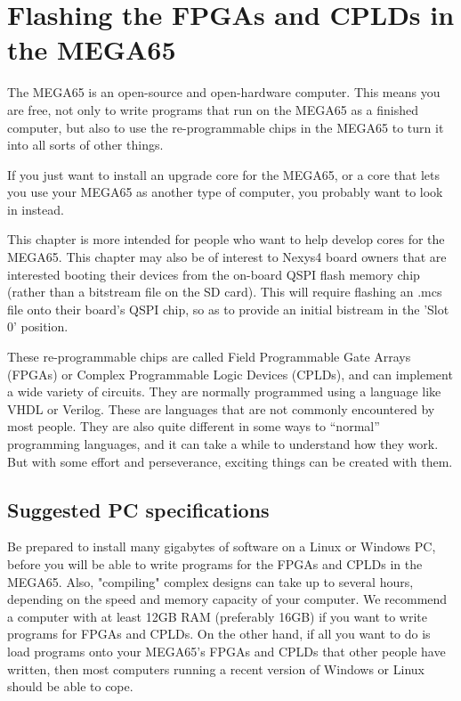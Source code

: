 \chapter{Flashing the FPGAs and CPLDs in the MEGA65}
\label{cha:fpgacpldflashing}

The MEGA65 is an open-source and open-hardware computer. This means you are free,
not only to write programs that run on the MEGA65 as a finished computer, but also to
use the re-programmable chips in the MEGA65 to turn it into all sorts of other things.

If you just want to install an upgrade core for the MEGA65, or a core that lets you use
your MEGA65 as another type of computer, you probably want to look in
 instead.

This chapter is more intended for people who want to help develop cores for the MEGA65. This chapter may also be of interest to Nexys4 board owners that are interested booting their devices from the on-board QSPI flash memory chip (rather than a bitstream file on the SD card). This will require flashing an .mcs file onto their board's QSPI chip, so as to provide an initial bistream in the 'Slot 0' position.

These re-programmable chips are called Field Programmable Gate Arrays (FPGAs) or
Complex Programmable Logic Devices (CPLDs), and can implement a wide variety of circuits.
They are normally programmed using a language like VHDL or Verilog.  These
are languages that are not commonly encountered by most people.  They are also quite
different in some ways to ``normal'' programming languages, and it can take a while to
understand how they work. But with some effort and perseverance, exciting things can be created with them.

\section{Suggested PC specifications}

Be prepared to install many gigabytes of software on a Linux or Windows PC, before you will
be able to write programs for the FPGAs and CPLDs in the MEGA65.  Also,
"compiling" complex
designs can take up to several hours, depending on the speed and memory
capacity of your computer.
We recommend a computer with at least 12GB RAM (preferably 16GB) if you want to write
programs for FPGAs and CPLDs. On the other hand, if all you want to do is load programs onto
your MEGA65's FPGAs and CPLDs that other people have written, then most
computers running a recent
version of Windows or Linux should be able to cope.

